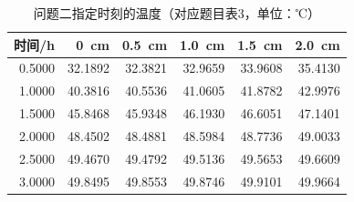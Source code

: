 \begin{table}[htbp]
\centering\small
\caption{问题二指定时刻的温度（对应题目表3，单位：℃）}\label{tab:paper3}
\begin{tabular}{rrrrrr}
\toprule
时间/h & 0~cm & 0.5~cm & 1.0~cm & 1.5~cm & 2.0~cm \\
\midrule
0.5000 & 32.1892 & 32.3821 & 32.9659 & 33.9608 & 35.4130 \\
1.0000 & 40.3816 & 40.5536 & 41.0605 & 41.8782 & 42.9976 \\
1.5000 & 45.8468 & 45.9348 & 46.1930 & 46.6051 & 47.1401 \\
2.0000 & 48.4502 & 48.4881 & 48.5984 & 48.7736 & 49.0033 \\
2.5000 & 49.4670 & 49.4792 & 49.5136 & 49.5653 & 49.6609 \\
3.0000 & 49.8495 & 49.8553 & 49.8746 & 49.9101 & 49.9664 \\
\bottomrule
\end{tabular}
\end{table}
